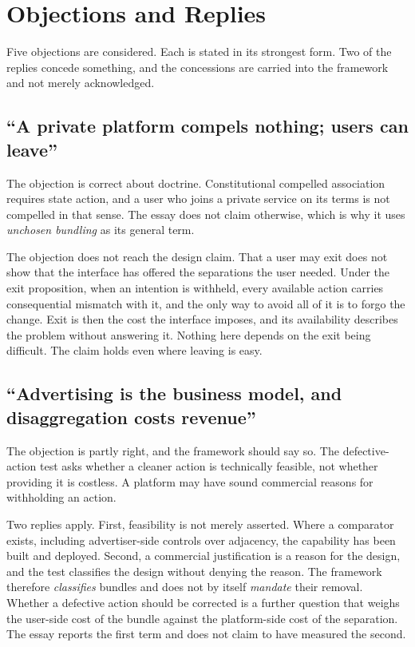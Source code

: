 
\section{Objections and Replies}\label{sec:objections}

Five objections are considered. Each is stated in its strongest form. Two of the replies concede something, and the concessions are carried into the framework and not merely acknowledged.

\subsection{``A private platform compels nothing; users can leave''}

The objection is correct about doctrine. Constitutional compelled association requires state action, and a user who joins a private service on its terms is not compelled in that sense. The essay does not claim otherwise, which is why it uses \emph{unchosen bundling} as its general term.

The objection does not reach the design claim. That a user may exit does not show that the interface has offered the separations the user needed. Under the exit proposition, when an intention is withheld, every available action carries consequential mismatch with it, and the only way to avoid all of it is to forgo the change. Exit is then the cost the interface imposes, and its availability describes the problem without answering it. Nothing here depends on the exit being difficult. The claim holds even where leaving is easy.

\subsection{``Advertising is the business model, and disaggregation costs revenue''}

The objection is partly right, and the framework should say so. The defective-action test asks whether a cleaner action is technically feasible, not whether providing it is costless. A platform may have sound commercial reasons for withholding an action.

Two replies apply. First, feasibility is not merely asserted. Where a comparator exists, including advertiser-side controls over adjacency, the capability has been built and deployed. Second, a commercial justification is a reason for the design, and the test classifies the design without denying the reason. The framework therefore \emph{classifies} bundles and does not by itself \emph{mandate} their removal. Whether a defective action should be corrected is a further question that weighs the user-side cost of the bundle against the platform-side cost of the separation. The essay reports the first term and does not claim to have measured the second.

